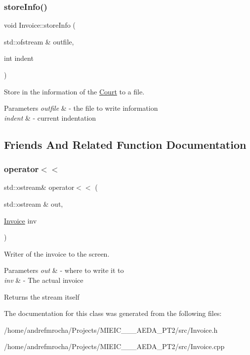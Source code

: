 \subsubsection{\texorpdfstring{store\+Info()}{storeInfo()}}
{\footnotesize\ttfamily void Invoice\+::store\+Info (\begin{DoxyParamCaption}\item[{std\+::ofstream \&}]{outfile,  }\item[{int}]{indent }\end{DoxyParamCaption})}



Store in the information of the \mbox{\hyperlink{class_court}{Court}} to a file. 


\begin{DoxyParams}{Parameters}
{\em outfile} & -\/ the file to write information \\
\hline
{\em indent} & -\/ current indentation \\
\hline
\end{DoxyParams}


\subsection{Friends And Related Function Documentation}
\mbox{\label{class_invoice_a1ff3da2cc7abd9df37b2936772ce9ff7}} 
\subsubsection{\texorpdfstring{operator$<$$<$}{operator<<}}
{\footnotesize\ttfamily std\+::ostream\& operator$<$$<$ (\begin{DoxyParamCaption}\item[{std\+::ostream \&}]{out,  }\item[{\mbox{\hyperlink{class_invoice}{Invoice}}}]{inv }\end{DoxyParamCaption})\hspace{0.3cm}{\ttfamily [friend]}}



Writer of the invoice to the screen. 


\begin{DoxyParams}{Parameters}
{\em out} & -\/ where to write it to \\
\hline
{\em inv} & -\/ The actual invoice \\
\hline
\end{DoxyParams}
\begin{DoxyReturn}{Returns}
the stream itself 
\end{DoxyReturn}


The documentation for this class was generated from the following files\+:\begin{DoxyCompactItemize}
\item 
/home/andrefmrocha/\+Projects/\+M\+I\+E\+I\+C\+\_\+\_\+\_\+\+A\+E\+D\+A\+\_\+\+P\+T2/src/Invoice.\+h\item 
/home/andrefmrocha/\+Projects/\+M\+I\+E\+I\+C\+\_\+\_\+\_\+\+A\+E\+D\+A\+\_\+\+P\+T2/src/Invoice.\+cpp\end{DoxyCompactItemize}
